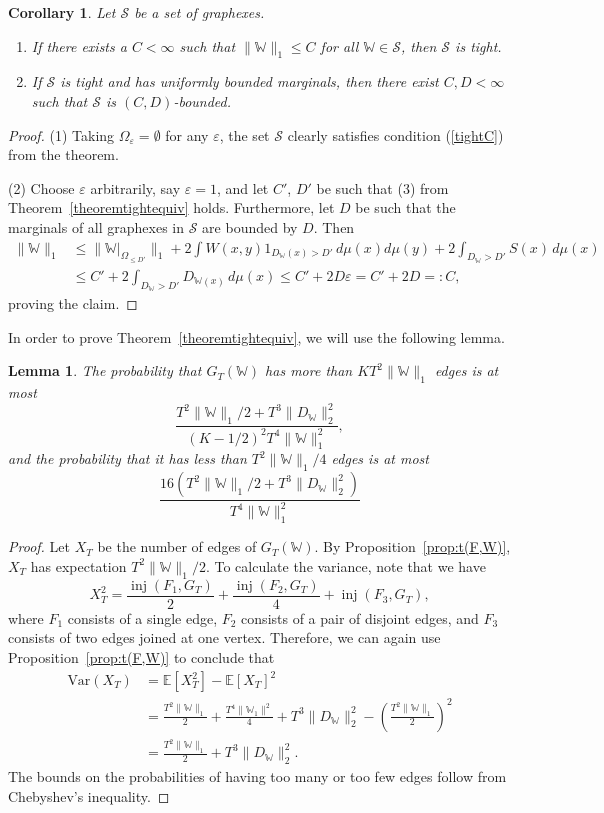 \documentclass{amsart}
\numberwithin{equation}{section}
\numberwithin{figure}{section}
\newtheorem{lemma}[theorem]{Lemma}
\newtheorem{corollary}[theorem]{Corollary}
\theoremstyle{definition}
\theoremstyle{remark}
\DeclareMathOperator{\inj}{inj}
\newcommand{\EE}{\mathbb{E}}
\newcommand{\cW}{\mathbb{W}}
\newcommand{\cS}{\mathcal{S}}
\begin{document}
\begin{corollary}\label{cor:C-bounded-tight}
Let $\cS$ be a set of graphexes.
\begin{enumerate}
\item If there exists a $C<\infty$ such that $\|\cW\|_1\leq C$ for all
    $\cW\in\cS$, then $\cS$ is tight.

\item If $\cS$ is tight and has uniformly bounded marginals, then there
    exist $C,D<\infty$ such that $\cS$ is $(C,D)$-bounded.
\end{enumerate}
\end{corollary}
\begin{proof}
(1) Taking $\Omega_\varepsilon=\emptyset$ for any $\varepsilon$, the set
$\cS$ clearly satisfies condition (\ref{tightC}) from the theorem.

(2) Choose $\varepsilon$ arbitrarily, say $\varepsilon=1$, and let $C'$, $D'$
be such that (3) from Theorem~\ref{theoremtightequiv} holds. Furthermore, let
$D$ be such that the marginals of all graphexes in $\cS$ are bounded by $D$.
Then
\begin{align*}
\|\cW\|_1&\leq\|\cW|_{\Omega_{\leq D'}}\|_1+2\int W(x,y)1_{D_\cW(x) >D'}\,d\mu(x) d\mu(y)+{2}\int_{D_\cW >D'}S(x)\,d\mu(x)
\\
&\leq C'+2\int_{D_{\cW}>D'} D_{\cW(x)}\,d\mu(x)
\leq C'+2 D\varepsilon=C'+2D=:C,
\end{align*}
proving the claim.
\end{proof}

In order to prove Theorem~\ref{theoremtightequiv}, we will use the following
lemma.

\begin{lemma} \label{lem:edgebound}
The probability that $G_T(\cW)$ has more than $KT^2\|\cW\|_1$ edges is at
most
\[\frac{T^2\|\cW\|_1/2+T^3\|D_\cW\|_2^2}{(K-1/2)^2T^4\|\cW\|_1^2},
\]
and the probability that it has less than $T^2\|\cW\|_1/4$ edges is at most
\[\frac{16(T^2\|\cW\|_1/2+T^3\|D_\cW\|_2^2)}{T^4\|\cW\|_1^2}
\]
\end{lemma}

\begin{proof}
Let $X_T$ be the number of edges of $G_T(\cW)$. By
Proposition~\ref{prop:t(F,W)}, $X_T$ has expectation $T^2 \|\cW\|_1/2$. To
calculate the variance, note that we have
\[X_T^2=\frac{\inj(F_1,G_T)}{2}+\frac{\inj(F_2,G_T)}{4}+\inj(F_3,G_T),\]
where $F_1$ consists of a single edge, $F_2$ consists of a pair of disjoint
edges, and $F_3$ consists of two edges joined at one vertex. Therefore, we
can again use Proposition~\ref{prop:t(F,W)} to conclude that
\begin{align*}
\text{Var}(X_T)&=\EE[X_T^2]-\EE[X_T]^2\\
&=\frac{T^2\|\cW\|_1}{2}+\frac{T^4
\|\cW_1\|^2}{4}+T^3\|D_\cW\|_2^2-\left(\frac{T^2\|\cW\|_1}{2}\right)^2\\
&=\frac{T^2\|\cW\|_1}{2}+T^3\|D_\cW\|_2^2 .
\end{align*}
The bounds on the probabilities of having too many or too few edges
follow from Chebyshev's inequality.
\end{proof}
\end{document}
